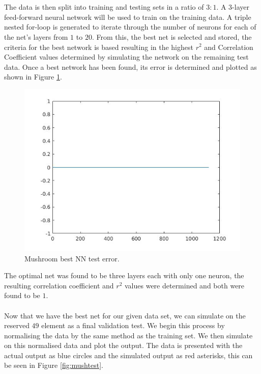 \documentclass{article}%
\begin{document}
\\
\\
The data is then split into training and testing sets in a ratio of $3:1$. A 3-layer feed-forward neural network will be used to train on the training data. A triple nested for-loop is generated to iterate through the number of neurons for each of the net's layers from $1$ to $20$. From this, the best net is selected and stored, the criteria for the best network is based resulting in the highest $r^2$ and Correlation Coefficient values determined by simulating the network on the remaining test data. Once a best network has been found, its error is determined and plotted as shown in Figure \ref{fig:mushtrain}.
\begin{figure}[H]
\centering
\includegraphics[scale=0.5]{Images/mushtrain.jpg}
\caption{Mushroom best NN test error.}
\label{fig:mushtrain}
\end{figure}
The optimal net was found to be three layers each with only one neuron, the resulting correlation coefficient and $r^2$ values were determined and both were found to be $1$.
\\
\\
Now that we have the best net for our given data set, we can simulate on the reserved $49$ element as a final validation test. We begin this process by normalising the data by the same method as the training set. We then simulate on this normalised data and plot the output. The data is presented with the actual output as blue circles and the simulated output as red asterisks, this can be seen in Figure \ref{fig:mushtest}.
\end{document}
